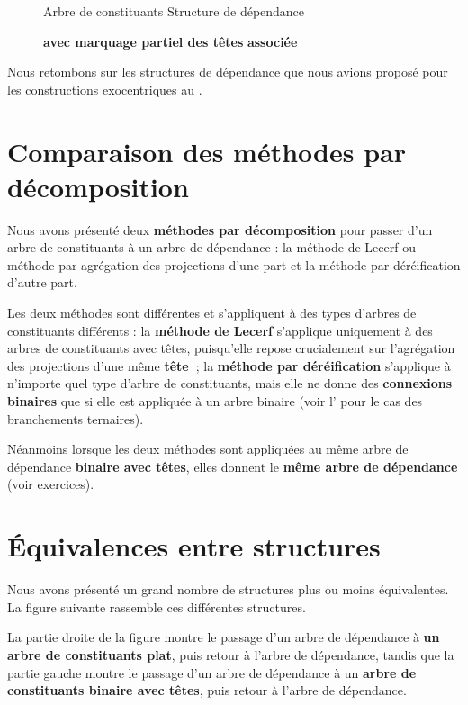 \begin{figure}

  Arbre de constituants                Structure de dépendance

               \textbf{avec marquage partiel des têtes}               \textbf{associée}
\caption{\label{fig:}}
\end{figure}

Nous retombons sur les structures de dépendance que nous avions proposé pour les constructions exocentriques au .

\section{Comparaison des méthodes par décomposition}\label{sec:3.4.24}

Nous avons présenté deux \textbf{méthodes par décomposition} pour passer d’un arbre de constituants à un arbre de dépendance : la méthode de Lecerf ou méthode par agrégation des projections d’une part et la méthode par déréification d’autre part.

Les deux méthodes sont différentes et s’appliquent à des types d’arbres de constituants différents : la \textbf{méthode de Lecerf} s’applique uniquement à des arbres de constituants avec têtes, puisqu’elle repose crucialement sur l’agrégation des projections d’une même \textbf{tête~}; la \textbf{méthode par déréification} s’applique à n’importe quel type d’arbre de constituants, mais elle ne donne des \textbf{connexions binaires} que si elle est appliquée à un arbre binaire (voir l’ pour le cas des branchements ternaires).

Néanmoins lorsque les deux méthodes sont appliquées au même arbre de dépendance \textbf{binaire avec têtes}, elles donnent le \textbf{même arbre de dépendance} (voir exercices).

\section{Équivalences entre structures}\label{sec:3.4.25}

Nous avons présenté un grand nombre de structures plus ou moins équivalentes. La figure suivante rassemble ces différentes structures.

La partie droite de la figure montre le passage d’un arbre de dépendance à \textbf{un arbre de constituants plat}, puis retour à l’arbre de dépendance, tandis que la partie gauche montre le passage d’un arbre de dépendance à un \textbf{arbre de constituants binaire avec têtes}, puis retour à l’arbre de dépendance.

